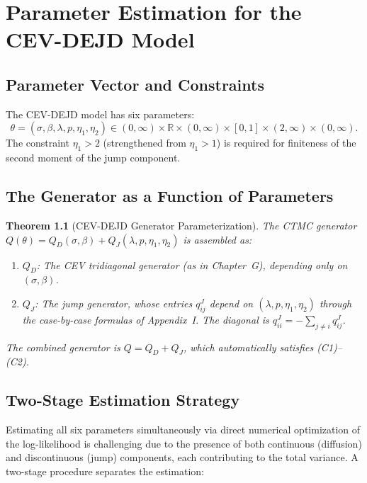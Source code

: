 \documentclass[11pt,a4paper,openany]{book}
\theoremstyle{definition}
\theoremstyle{plain}
\newtheorem{theorem}{Theorem}[chapter]
\theoremstyle{remark}
\newcommand{\1}{\mathbbm{1}}
\newcommand{\R}{\mathbb{R}}
\begin{document}
\chapter{Parameter Estimation for the CEV-DEJD Model}

\section{Parameter Vector and Constraints}

The CEV-DEJD model has six parameters:
\[
\theta = (\sigma, \beta, \lambda, p, \eta_{1}, \eta_{2}) \in (0,\infty) \times \R \times (0,\infty) \times [0,1] \times (2,\infty) \times (0,\infty).
\]
The constraint $\eta_{1} > 2$ (strengthened from $\eta_{1} > 1$) is required for finiteness of the second moment of the jump component.

\section{The Generator as a Function of Parameters}

\begin{theorem}[CEV-DEJD Generator Parameterization]
The CTMC generator $Q(\theta) = Q_{D}(\sigma, \beta) + Q_{J}(\lambda, p, \eta_{1}, \eta_{2})$ is assembled as:
\begin{enumerate}[label=(\arabic*)]
    \item $Q_{D}$: The CEV tridiagonal generator (as in Chapter~G), depending only on $(\sigma, \beta)$.
    \item $Q_{J}$: The jump generator, whose entries $q_{ij}^{J}$ depend on $(\lambda, p, \eta_{1}, \eta_{2})$ through the case-by-case formulas of Appendix~I. The diagonal is $q_{ii}^{J} = -\sum_{j \neq i} q_{ij}^{J}$.
\end{enumerate}
The combined generator is $Q = Q_{D} + Q_{J}$, which automatically satisfies (C1)--(C2).
\end{theorem}

\section{Two-Stage Estimation Strategy}

Estimating all six parameters simultaneously via direct numerical optimization of the log-likelihood is challenging due to the presence of both continuous (diffusion) and discontinuous (jump) components, each contributing to the total variance. A two-stage procedure separates the estimation:
\end{document}
